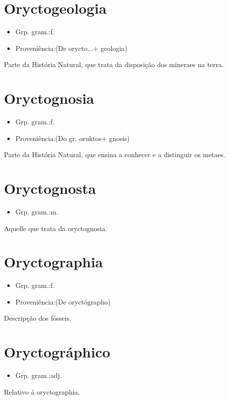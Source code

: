 \section{Oryctogeologia}
\begin{itemize}
\item {Grp. gram.:f.}
\end{itemize}
\begin{itemize}
\item {Proveniência:(De \textunderscore orycto...\textunderscore  + \textunderscore geologia\textunderscore )}
\end{itemize}
Parte da História Natural, que trata da disposição dos mineraes na terra.
\section{Oryctognosia}
\begin{itemize}
\item {Grp. gram.:f.}
\end{itemize}
\begin{itemize}
\item {Proveniência:(Do gr. \textunderscore oruktos\textunderscore  + \textunderscore gnosis\textunderscore )}
\end{itemize}
Parte da História Natural, que ensina a conhecer e a distinguir os metaes.
\section{Oryctognosta}
\begin{itemize}
\item {Grp. gram.:m.}
\end{itemize}
Aquelle que trata da oryctognosia.
\section{Oryctographia}
\begin{itemize}
\item {Grp. gram.:f.}
\end{itemize}
\begin{itemize}
\item {Proveniência:(De \textunderscore oryctógrapho\textunderscore )}
\end{itemize}
Descripção dos fósseis.
\section{Oryctográphico}
\begin{itemize}
\item {Grp. gram.:adj.}
\end{itemize}
Relativo á oryctographia.
